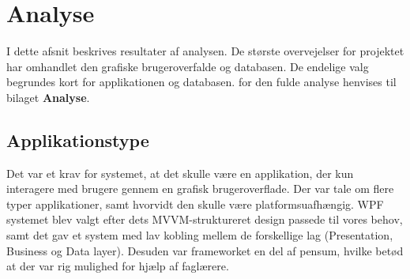\documentclass[Rapport/Rapport_main.tex]{subfiles}
\begin{document}
\section{Analyse}
I dette afsnit beskrives resultater af analysen. De største overvejelser for projektet har omhandlet den grafiske brugeroverfalde og databasen. De endelige valg begrundes kort for applikationen og databasen. for den fulde analyse henvises til bilaget \textbf{Analyse}.

\subsection{Applikationstype}
Det var et krav for systemet, at det skulle være en applikation, der kun interagere med brugere gennem en grafisk brugeroverflade. Der var tale om flere typer applikationer, samt hvorvidt den skulle være platformsuafhængig. WPF systemet blev valgt efter dets MVVM-struktureret design passede til vores behov, samt det gav et system med lav kobling mellem de forskellige lag (Presentation, Business og Data layer). Desuden var frameworket en del af pensum, hvilke betød at der var rig mulighed for hjælp af faglærere. 
\end{document}
